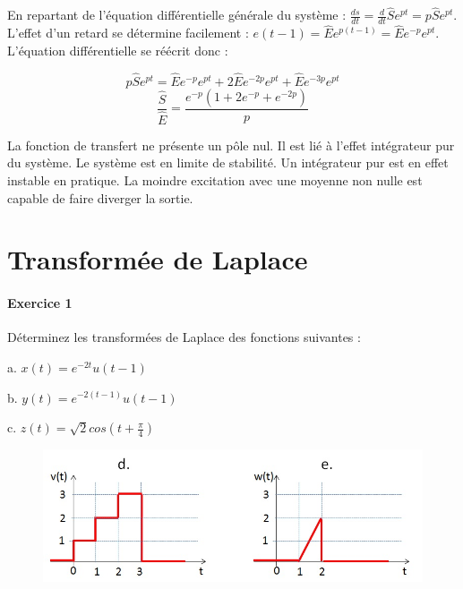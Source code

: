 \documentclass[11pt]{report}
\begin{document}
 	En repartant de l'équation différentielle générale du système : $\frac{ds}{dt}=\frac{d}{dt}\hat{S}e^{pt}=p\hat{S}e^{pt}$. L'effet d'un retard se détermine facilement : $e(t-1)=\hat{E}e^{p(t-1)}=\hat{E}e^{-p}e^{pt}$. L'équation différentielle se réécrit donc :
 	
 	\begin{equation*}
 	p\hat{S}e^{pt}=\hat{E}e^{-p}e^{pt}+2\hat{E}e^{-2p}e^{pt}+\hat{E}e^{-3p}e^{pt}
 	\end{equation*}
 	\begin{equation*}
 	\frac{\hat{S}}{\hat{E}}=\frac{e^{-p}(1+2e^{-p}+e^{-2p})}{p}
 	\end{equation*}
 	
 	La fonction de transfert ne présente un pôle nul.  Il est lié à l'effet intégrateur pur du système. Le système est en limite de stabilité. Un intégrateur pur est en effet instable en pratique. La moindre excitation avec une moyenne non nulle est capable de faire diverger la sortie.
 	
 	
	
	\newpage
	
	\chapter{Transformée de Laplace}
	
	
	\subsubsection{Exercice 1}
	
	Déterminez les transformées de Laplace des fonctions suivantes :
	
	a. $x(t)=e^{-2t}u(t-1)$
	
	b. $y(t)=e^{-2(t-1)}u(t-1)$
	
	c. $z(t) = \sqrt{2}cos(t+\frac{\pi}{4})$
	
	\begin{figure}[h!]
		\centering
		\includegraphics[scale=0.5]{images/Exo_2_1_a.jpg} 
	\end{figure} 
\end{document}

